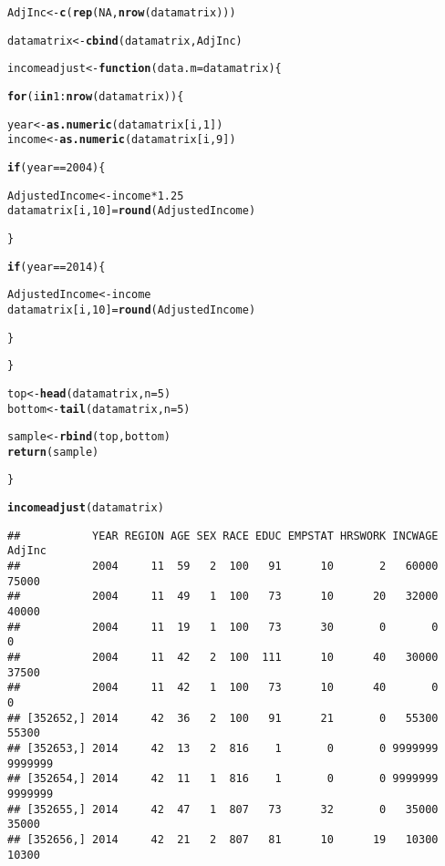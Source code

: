 \documentclass{article}\usepackage[]{graphicx}\usepackage[]{color}
\makeatletter
\newcommand{\hlnum}[1]{\textcolor[rgb]{0.686,0.059,0.569}{#1}}%
\newcommand{\hlopt}[1]{\textcolor[rgb]{0,0,0}{#1}}%
\newcommand{\hlstd}[1]{\textcolor[rgb]{0.345,0.345,0.345}{#1}}%
\newcommand{\hlkwa}[1]{\textcolor[rgb]{0.161,0.373,0.58}{\textbf{#1}}}%
\newcommand{\hlkwb}[1]{\textcolor[rgb]{0.69,0.353,0.396}{#1}}%
\newcommand{\hlkwc}[1]{\textcolor[rgb]{0.333,0.667,0.333}{#1}}%
\newcommand{\hlkwd}[1]{\textcolor[rgb]{0.737,0.353,0.396}{\textbf{#1}}}%
\newenvironment{kframe}{%
 \def\at@end@of@kframe{}%
 \ifinner\ifhmode%
  \def\at@end@of@kframe{\end{minipage}}%
  \begin{minipage}{\columnwidth}%
 \fi\fi%
 \def\FrameCommand##1{\hskip\@totalleftmargin \hskip-\fboxsep
 \colorbox{shadecolor}{##1}\hskip-\fboxsep
     \hskip-\linewidth \hskip-\@totalleftmargin \hskip\columnwidth}%
 \MakeFramed {\advance\hsize-\width
   \@totalleftmargin\z@ \linewidth\hsize
   \@setminipage}}%
 {\par\unskip\endMakeFramed%
 \at@end@of@kframe}
\newenvironment{knitrout}{}{} %
\makeatother
\begin{document}
\begin{knitrout}
\begin{kframe}
\begin{alltt}
\hlstd{AdjInc} \hlkwb{<-} \hlkwd{c}\hlstd{(}\hlkwd{rep}\hlstd{(}\hlnum{NA}\hlstd{,} \hlkwd{nrow}\hlstd{(datamatrix)))}

\hlstd{datamatrix} \hlkwb{<-} \hlkwd{cbind}\hlstd{(datamatrix, AdjInc)}

\hlstd{incomeadjust} \hlkwb{<-} \hlkwa{function}\hlstd{(}\hlkwc{data.m} \hlstd{= datamatrix)\{}

  \hlkwa{for} \hlstd{(i} \hlkwa{in} \hlnum{1}\hlopt{:}\hlkwd{nrow}\hlstd{(datamatrix))\{}

    \hlstd{year} \hlkwb{<-} \hlkwd{as.numeric}\hlstd{(datamatrix[i,}\hlnum{1}\hlstd{])}
    \hlstd{income} \hlkwb{<-} \hlkwd{as.numeric}\hlstd{(datamatrix[i,}\hlnum{9}\hlstd{])}

    \hlkwa{if} \hlstd{(year} \hlopt{==} \hlnum{2004}\hlstd{)\{}

      \hlstd{AdjustedIncome} \hlkwb{<-} \hlstd{income} \hlopt{*} \hlnum{1.25}
      \hlstd{datamatrix[i,}\hlnum{10}\hlstd{]} \hlkwb{=} \hlkwd{round}\hlstd{(AdjustedIncome)}

    \hlstd{\}}

    \hlkwa{if} \hlstd{(year} \hlopt{==} \hlnum{2014}\hlstd{)\{}

      \hlstd{AdjustedIncome} \hlkwb{<-} \hlstd{income}
      \hlstd{datamatrix[i,}\hlnum{10}\hlstd{]} \hlkwb{=} \hlkwd{round}\hlstd{(AdjustedIncome)}

    \hlstd{\}}


  \hlstd{\}}


  \hlstd{top} \hlkwb{<-} \hlkwd{head}\hlstd{(datamatrix,} \hlkwc{n}\hlstd{=}\hlnum{5}\hlstd{)}
  \hlstd{bottom}\hlkwb{<-} \hlkwd{tail}\hlstd{(datamatrix,} \hlkwc{n}\hlstd{=}\hlnum{5}\hlstd{)}

  \hlstd{sample} \hlkwb{<-} \hlkwd{rbind}\hlstd{(top,bottom)}
  \hlkwd{return}\hlstd{(sample)}

\hlstd{\}}

\hlkwd{incomeadjust}\hlstd{(datamatrix)}
\end{alltt}
\begin{verbatim}
##           YEAR REGION AGE SEX RACE EDUC EMPSTAT HRSWORK INCWAGE  AdjInc
##           2004     11  59   2  100   91      10       2   60000   75000
##           2004     11  49   1  100   73      10      20   32000   40000
##           2004     11  19   1  100   73      30       0       0       0
##           2004     11  42   2  100  111      10      40   30000   37500
##           2004     11  42   1  100   73      10      40       0       0
## [352652,] 2014     42  36   2  100   91      21       0   55300   55300
## [352653,] 2014     42  13   2  816    1       0       0 9999999 9999999
## [352654,] 2014     42  11   1  816    1       0       0 9999999 9999999
## [352655,] 2014     42  47   1  807   73      32       0   35000   35000
## [352656,] 2014     42  21   2  807   81      10      19   10300   10300
\end{verbatim}
\end{kframe}
\end{knitrout}
\end{document}
